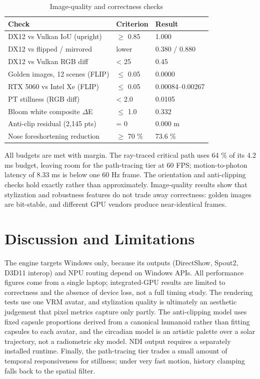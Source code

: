 \documentclass[conference]{IEEEtran}
\begin{document}
\begin{table}[!t]
\renewcommand{\arraystretch}{1.15}
\caption{Image-quality and correctness checks}
\label{tab:quality}
\centering\footnotesize
\begin{tabular}{p{}p{}p{}}
\hline
\textbf{Check} & \textbf{Criterion} & \textbf{Result} \\
\hline
DX12 vs Vulkan IoU (upright) & $\ge$ 0.85 & 1.000 \\
DX12 vs flipped / mirrored & lower & 0.380 / 0.880 \\
DX12 vs Vulkan RGB diff & < 25 & 0.45 \\
Golden images, 12 scenes (FLIP) & $\le$ 0.05 & 0.0000 \\
RTX 5060 vs Intel Xe (FLIP) & $\le$ 0.05 & 0.00084--0.00267 \\
PT stillness (RGB diff) & < 2.0 & 0.0105 \\
Bloom white composite $\Delta$E & $\le$ 1.0 & 0.332 \\
Anti-clip residual (2,145 pts) & = 0 & 0.000 m \\
Nose foreshortening reduction & $\ge$ 70 \% & 73.6 \% \\
\hline
\end{tabular}
\end{table}

All budgets are met with margin. The ray-traced critical path uses 64 \% of its 4.2 ms budget, leaving room for the path-tracing tier at 60 FPS; motion-to-photon latency of 8.33 ms is below one 60 Hz frame. The orientation and anti-clipping checks hold exactly rather than approximately. Image-quality results show that stylization and robustness features do not trade away correctness: golden images are bit-stable, and different GPU vendors produce near-identical frames.


\section{Discussion and Limitations}
The engine targets Windows only, because its outputs (DirectShow, Spout2, D3D11 interop) and NPU routing depend on Windows APIs. All performance figures come from a single laptop; integrated-GPU results are limited to correctness and the absence of device loss, not a full timing study. The rendering tests use one VRM avatar, and stylization quality is ultimately an aesthetic judgement that pixel metrics capture only partly. The anti-clipping model uses fixed capsule proportions derived from a canonical humanoid rather than fitting capsules to each avatar, and the circadian model is an artistic palette over a solar trajectory, not a radiometric sky model. NDI output requires a separately installed runtime. Finally, the path-tracing tier trades a small amount of temporal responsiveness for stillness; under very fast motion, history clamping falls back to the spatial filter.
\end{document}
